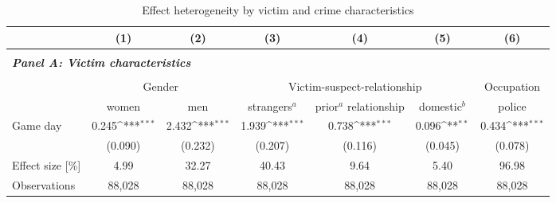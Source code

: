 

\begin{table}[ht] \centering 
	\begin{threeparttable} \centering \caption{Effect heterogeneity by victim and crime characteristics}
		\label{tab_soc_ext:reg_fe_assrate_victim_crime_chars}
		{\def\sym#1{\ifmmode^{#1}\else\(^{#1}\)\fi} 
			\begin{tabular}{l*{6}{c}}
				\toprule 
				&\multicolumn{1}{c}{(1)}&\multicolumn{1}{c}{(2)}&\multicolumn{1}{c}{(3)}&\multicolumn{1}{c}{(4)}&\multicolumn{1}{c}{(5)}&\multicolumn{1}{c}{(6)}\\
				\midrule

				\\
				\multicolumn{6}{l}{\textit{\textbf{Panel A: Victim characteristics}}} \\\\
					& \multicolumn{2}{c}{Gender} & \multicolumn{3}{c}{Victim-suspect-relationship} & Occupation \\
					\cmidrule(lr){2-3} \cmidrule(lr){4-6} \cmidrule(lr){7-7}
				&  women & men & strangers$^a$ & \clb{c}{prior$^a$\\relationship} & domestic$^b$ & police \\
				\midrule			
				Game day           		 &     0.245\sym{***}&       2.432\sym{***}&       1.939\sym{***}&       0.738\sym{***}&       0.096\sym{**} &       0.434\sym{***}\\
				                    	 &   (0.090)         &     (0.232)         &     (0.207)         &     (0.116)         &     (0.045)         &     (0.078)         \\
				Effect size [\%]&      4.99         &       32.27         &       40.43         &        9.64         &        5.40         &       96.98         \\
				Observations        	 &    88,028         &      88,028         &      88,028         &      88,028         &      88,028         &      88,028         \\
				

\end{tabular}}
\end{threeparttable}
\end{table}
